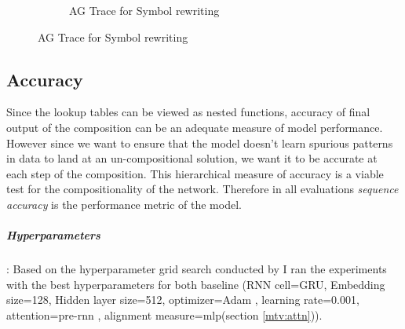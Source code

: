 \begin{figure}[ht]
\begin{subfigure}[b]{0.5\linewidth}
		\fi 
		\caption{AG Trace for Symbol rewriting} 
		\label{ag_sr} 
		\vspace{2ex}
	\end{subfigure}
	\label{ag_trace_lt_sr}
\end{figure}


\subsection{Accuracy}
Since the lookup tables can be viewed as nested functions, accuracy of final output of the composition can be an adequate measure of model performance. However since we want to ensure that the model doesn't learn spurious patterns in data to land at an un-compositional solution, we want it to be accurate at each step of the composition. This hierarchical measure of accuracy is a viable test for the compositionality of the network. Therefore in all evaluations \textit{sequence accuracy} is the performance metric of the model.

\subparagraph{Hyperparameters}: Based on the hyperparameter grid search conducted by \cite{Hupkes2018} I ran the experiments with the best hyperparameters for both baseline (RNN cell=GRU, Embedding size=128, Hidden layer size=512, optimizer=Adam \citep{KingmaB14}, learning rate=0.001, attention=pre-rnn \citep{Bahdanau2014}, alignment measure=mlp(section \ref{mtv:attn})).

